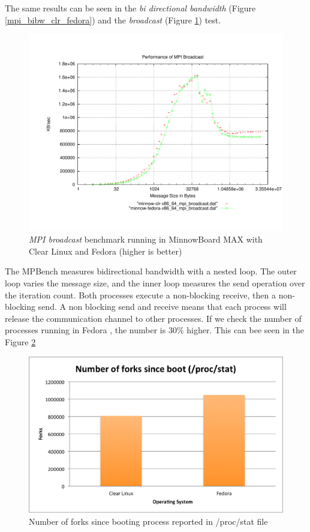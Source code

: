 The same results can be seen in the \textit{bi directional bandwidth} (Figure
\ref{mpi_bibw_clr_fedora}) and the \textit{broadcast} (Figure
\ref{mpi_broadcast_clr_fedora}) test. 

\begin{figure}
  \includegraphics[width=\paperwidth]{images/mpbench_clr_experiments/mpi_broadcast.pdf}
\caption{\textit{MPI broadcast} benchmark running in  MinnowBoard MAX with Clear Linux and
Fedora (higher is better)}
\label{mpi_broadcast_clr_fedora}
\end{figure}

The MPBench measures bidirectional bandwidth with a nested loop. The outer loop
varies the message size, and the inner loop measures the send operation over
the iteration count. Both processes execute a non-blocking receive, then a
non-blocking send.  A non blocking send and receive means that each process
will release the communication channel to other processes. If we check the
number of processes running in Fedora , the number is 30\% higher. This can bee
seen in the Figure \ref{number_forks_fedora_clr}

\begin{figure}[H]
\centering
\includegraphics[width=1 \textwidth]{images/number_forks.png}
\caption{Number of forks since booting process reported in /proc/stat file }
\label{number_forks_fedora_clr}
\end{figure}

